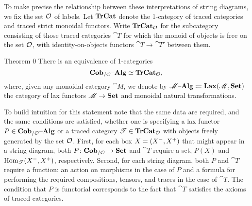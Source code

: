 \documentclass[11pt,oneside,article]{memoir}
\begin{document}
To make precise the relationship between these interpretations of string diagrams, we fix the set
$\mathcal{O}$ of labels. Let $\mathbf{TrCat}$ denote the 1-category of traced categories and traced strict
monoidal functors. Write $\mathbf{TrCat}_{\mathcal{O}}$ for the subcategory consisting of those traced
categories $\cat{T}$ for which the monoid of objects is free on the set $\mathcal{O}$, with
identity-on-objects functors $\cat{T}\to\cat{T}'$ between them.

\begin{named}{Theorem 0}
    \label{thm:traced_is_cob_alg}
  There is an equivalence of 1-categories
  \begin{equation}
      \label{eq:single_fiber_tr}
    \mathbf{Cob}_{/\mathcal{O}}{\text \textendash}\mathbf{Alg}\simeq\mathbf{TrCat}_{\mathcal{O}},
  \end{equation}
  where, given any monoidal category $\cat{M}$, we denote by
  $\mathscr{M}{\text \textendash}\mathbf{Alg}\coloneqq\mathbf{Lax}(\mathscr{M},\mathbf{Set})$ the category of lax functors $\mathscr{M}\to\mathbf{Set}$ and
  monoidal natural transformations.
\end{named}

To build intuition for this statement note that the same data are required, and the same conditions
are satisfied, whether one is specifying a lax functor $P\in\mathbf{Cob}_{/\mathcal{O}}{\text \textendash}\mathbf{Alg}$ or a traced category
$\mathscr{T}\in\mathbf{TrCat}_{\mathcal{O}}$ with objects freely generated by the set $\mathcal{O}$. First, for each box
$X=(X^-,X^+)$ that might appear in a string diagram, both $P\colon\mathbf{Cob}_{/\mathcal{O}}\to\mathbf{Set}$
and $\cat{T}$ require a set, $P(X)$ and $\operatorname{Hom}_{\mathscr{T}}(X^-,X^+)$, respectively. Second,
for each string diagram, both $P$ and $\cat{T}$ require a function: an action on morphisms in the
case of $P$ and a formula for performing the required compositions, tensors, and traces in the case
of $\cat{T}$. The condition that $P$ is functorial corresponds to the fact that $\cat{T}$ satisfies
the axioms of traced categories.
\end{document}

